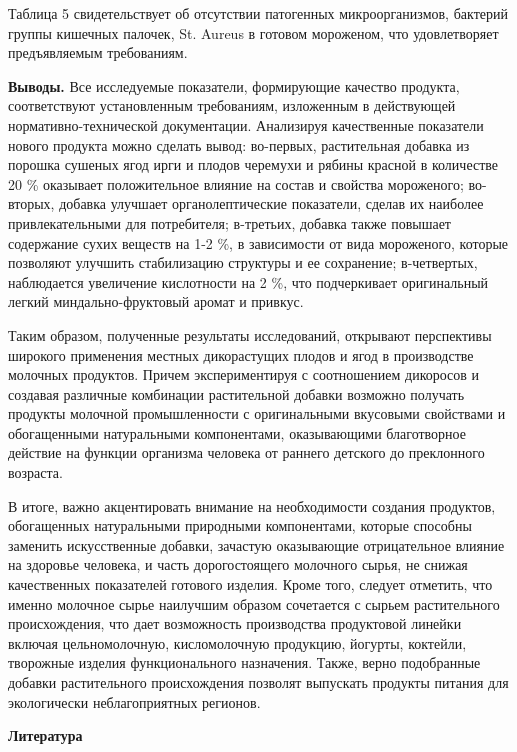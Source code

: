 \begin{multicols}{2}
Таблица 5 свидетельствует об отсутствии патогенных микроорганизмов,
бактерий группы кишечных палочек, St. Aureus в готовом мороженом, что
удовлетворяет предъявляемым требованиям.

{\bfseries Выводы.} Все исследуемые показатели, формирующие качество
продукта, соответствуют установленным требованиям, изложенным в
действующей нормативно-технической документации. Анализируя качественные
показатели нового продукта можно сделать вывод: во-первых, растительная
добавка из порошка сушеных ягод ирги и плодов черемухи и рябины красной
в количестве 20 \% оказывает положительное влияние на состав и свойства
мороженого; во- вторых, добавка улучшает органолептические показатели,
сделав их наиболее привлекательными для потребителя; в-третьих, добавка
также повышает содержание сухих веществ на 1-2 \%, в зависимости от вида
мороженого, которые позволяют улучшить стабилизацию структуры и ее
сохранение; в-четвертых, наблюдается увеличение кислотности на 2 \%, что
подчеркивает оригинальный легкий миндально-фруктовый аромат и привкус.

Таким образом, полученные результаты исследований, открывают перспективы
широкого применения местных дикорастущих плодов и ягод в производстве
молочных продуктов. Причем экспериментируя с соотношением дикоросов и
создавая различные комбинации растительной добавки возможно получать
продукты молочной промышленности с оригинальными вкусовыми свойствами и
обогащенными натуральными компонентами, оказывающими благотворное
действие на функции организма человека от раннего детского до
преклонного возраста.

В итоге, важно акцентировать внимание на необходимости создания
продуктов, обогащенных натуральными природными компонентами, которые
способны заменить искусственные добавки, зачастую оказывающие
отрицательное влияние на здоровье человека, и часть дорогостоящего
молочного сырья, не снижая качественных показателей готового изделия.
Кроме того, следует отметить, что именно молочное сырье наилучшим
образом сочетается с сырьем растительного происхождения, что дает
возможность производства продуктовой линейки включая цельномолочную,
кисломолочную продукцию, йогурты, коктейли, творожные изделия
функционального назначения. Также, верно подобранные добавки
растительного происхождения позволят выпускать продукты питания для
экологически неблагоприятных регионов.
\end{multicols}

\begin{center}
{\bfseries Литература}
\end{center}


